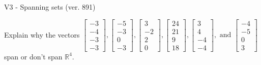 \begin{exercise}
  \begin{exerciseTitle}V3 - Spanning sets (ver. 891)\end{exerciseTitle}
  \begin{exerciseStatement}
    Explain why the vectors \(\left[\begin{array}{r}
-3 \\
-4 \\
-3 \\
-3
\end{array}\right] , \left[\begin{array}{r}
-5 \\
-3 \\
0 \\
-3
\end{array}\right] , \left[\begin{array}{r}
3 \\
-2 \\
2 \\
0
\end{array}\right] , \left[\begin{array}{r}
24 \\
21 \\
9 \\
18
\end{array}\right] , \left[\begin{array}{r}
3 \\
4 \\
-4 \\
-4
\end{array}\right] , \text{ and } \left[\begin{array}{r}
-4 \\
-5 \\
0 \\
3
\end{array}\right]\) span or don't span \(\mathbb{R}^4\). 
	



\end{exerciseStatement}
\end{exercise}
